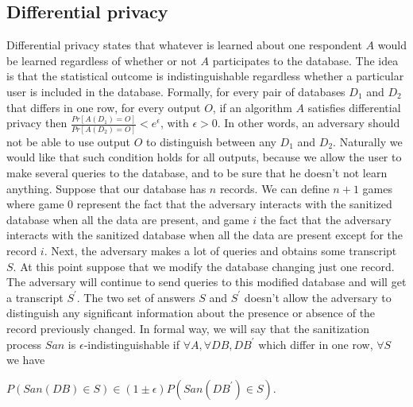 \subsection{Differential privacy}
Differential privacy states that whatever is learned about one respondent $A$ would be learned regardless of whether or not $A$ participates to the database. The idea is that the statistical outcome is indistinguishable regardless whether a particular user is included in the database. Formally, for every pair of databases $D_{1}$ and $D_{2}$ that differs in one row, for every output $O$, if an algorithm $A$ satisfies differential privacy then $\frac{Pr[A(D_{1}) = O]}{Pr[A(D_{2}) = O]} < e^{\epsilon}$, with $\epsilon > 0$. In other words, an adversary should not be able to use output $O$ to distinguish between any $D_{1}$ and $D_{2}$. Naturally we would like that such condition holds for all outputs, because we allow the user to make several queries to the database, and to be sure that he doesn't not learn anything. Suppose that our database has $n$ records. We can define $n + 1$ games where game $0$ represent the fact that the adversary interacts with the sanitized database when all the data are present, and game $i$ the fact that the adversary interacts with the sanitized database when all the data are present except for the record $i$. Next, the adversary makes a lot of queries and obtains some transcript $S$. At this point suppose that we modify the database changing just one record. The adversary will continue to send queries to this modified database and will get a transcript $S^{'}$. The two set of answers $S$ and $S^{'}$ doesn't allow the adversary to distinguish any significant information about the presence or absence of the record previously changed. In formal way, we will say that the sanitization process $San$ is $\epsilon$-indistinguishable if $\forall A, \forall DB, DB^{'}$ which differ in one row, $\forall S$ we have 
\begin{center}
$P(San(DB) \in S) \in (1 \pm \epsilon) P(San(DB^{'}) \in S)$.
\end{center}
